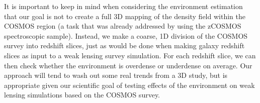 \documentclass[twocolumn,useAMS,usenatbib]{mn2e}
\newcommand{\rachel}[1]{{\textcolor{red}{#1}}}
\begin{document}

It is important to keep in mind when considering the environment
estimation that our goal is not to create a full 3D mapping of the
density field within the COSMOS region (a task that was already
addressed by \citealt{Kovac_Density10k} using the zCOSMOS
spectroscopic sample).  Instead, we make a coarse, 1D division of the
COSMOS survey into redshift slices, just as would be done when making
galaxy redshift slices as input to a weak lensing survey simulation.
For each redshift slice, we can then check whether the environment is
overdense or underdense on average.  Our approach will tend to wash
out some real trends from a 3D study, but is appropriate given our
scientific goal of testing effects of the environment on weak lensing
simulations based on the COSMOS survey.

\end{document}
